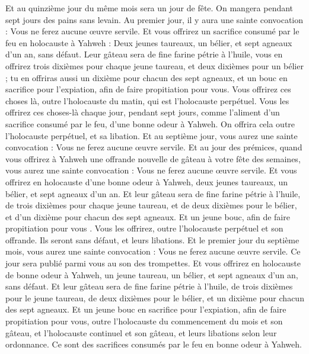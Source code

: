 \begin{multicols}{2}
Et au quinzième jour du même mois sera un jour de fête. On mangera pendant sept jours des pains sans levain.
Au premier jour, il y aura une sainte convocation : Vous ne ferez aucune œuvre servile.
Et vous offrirez un sacrifice consumé par le feu en holocauste à Yahweh : Deux jeunes taureaux, un bélier, et sept agneaux d'un an, sans défaut.
Leur gâteau sera de fine farine pétrie à l’huile, vous en offrirez trois dixièmes pour chaque jeune taureau, et deux dixièmes pour un bélier ;
tu en offriras aussi un dixième pour chacun des sept agneaux,
et un bouc en sacrifice pour l'expiation, afin de faire propitiation pour vous.
Vous offrirez ces choses là, outre l'holocauste du matin, qui est l'holocauste perpétuel.
Vous les offrirez ces choses-là chaque jour, pendant sept jours, comme l'aliment d'un sacrifice consumé par le feu, d'une bonne odeur à Yahweh. On offrira cela outre l'holocauste perpétuel, et sa libation.
Et au septième jour, vous aurez une sainte convocation : Vous ne ferez aucune œuvre servile.
Et au jour des prémices, quand vous offrirez à Yahweh une offrande nouvelle de gâteau à votre fête des semaines, vous aurez une sainte convocation : Vous ne ferez aucune œuvre servile.
Et vous offrirez en holocauste d'une bonne odeur à Yahweh, deux jeunes taureaux, un bélier, et sept agneaux d'un an.
Et leur gâteau sera de fine farine pétrie à l’huile, de trois dixièmes pour chaque jeune taureau, et de deux dixièmes pour le bélier,
et d'un dixième pour chacun des sept agneaux.
Et un jeune bouc, afin de faire propitiation pour vous .
Vous les offrirez, outre l'holocauste perpétuel et son offrande. Ils seront sans défaut, et leurs libations.
\VerseOne{}Et le premier jour du septième mois, vous aurez une sainte convocation : Vous ne ferez aucune œuvre servile. Ce jour sera publié parmi vous au son des trompettes.
Et vous offrirez en holocauste de bonne odeur à Yahweh, un jeune taureau, un bélier, et sept agneaux d'un an, sans défaut.
Et leur gâteau sera de fine farine pétrie à l’huile, de trois dixièmes pour le jeune taureau, de deux dixièmes pour le bélier,
et un dixième pour chacun des sept agneaux.
Et un jeune bouc en sacrifice pour l'expiation, afin de faire propitiation pour vous,
outre l’holocauste du commencement du mois et son gâteau, et l’holocauste continuel et son gâteau, et leurs libations selon leur ordonnance. Ce sont des sacrifices consumés par le feu en bonne odeur à Yahweh.

\end{multicols}

